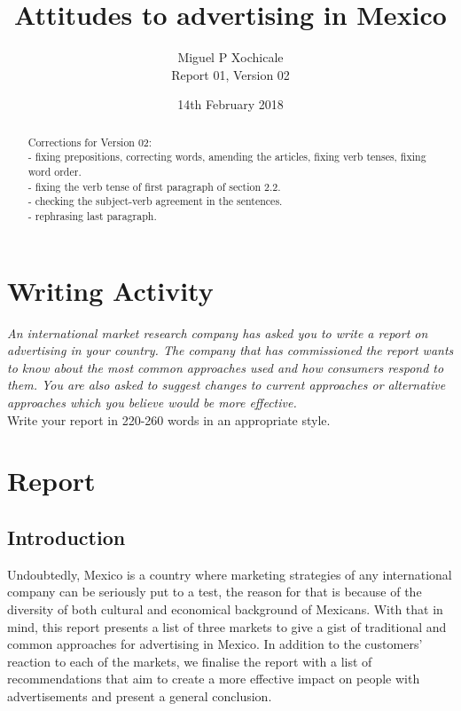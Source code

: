 \documentclass[10pt]{article}
\title{Attitudes to advertising in Mexico}
\author{Miguel P Xochicale \\
Report 01, Version 02}
\date{14th February 2018}
\begin{document}
\maketitle
\thispagestyle{empty} %



\begin{abstract}
Corrections for Version 02: \\
- fixing prepositions, correcting words, amending the articles, fixing verb tenses, fixing word order.\\
- fixing the verb tense of first paragraph of section 2.2.\\
- checking the subject-verb agreement in the sentences. \\
- rephrasing last paragraph.
\end{abstract}


\section{Writing Activity}
\textit{
An international market research company has asked you to write a report
on advertising in your country. The company that has commissioned the 
report wants to know about the most common approaches used and how 
consumers respond to them. You are also asked to suggest changes to 
current approaches or alternative approaches which you believe would
be more effective.
}
\\
Write your report in 220-260 words in an appropriate style.

\section{Report}
\subsection{Introduction}

Undoubtedly, Mexico is a country where marketing strategies of any 
international company can be seriously put to a test, the reason for that
is because of the diversity of both cultural and economical background of 
Mexicans. With that in mind, this report presents a list of three markets 
to give a gist of traditional and common approaches for advertising
in Mexico. 
In addition to the customers' reaction to each of the markets, 
we finalise the report with a list of  recommendations that aim 
to create a more effective impact on people with advertisements
and present a general conclusion.
\end{document}

